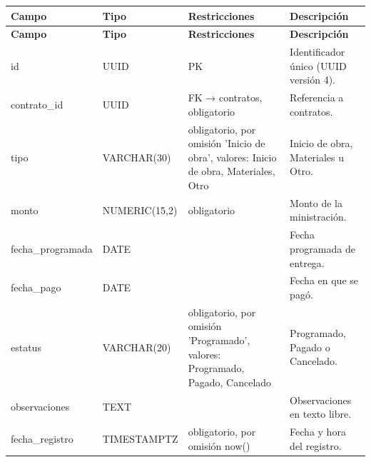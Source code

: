 \begin{xltabular}{\linewidth}{@{}>{\ttfamily\footnotesize}p{4.9cm}>{\ttfamily\footnotesize}p{2.4cm}>{\raggedright\arraybackslash\footnotesize}p{3.3cm}>{\footnotesize}X@{}}
\toprule\normalfont\sffamily\bfseries\footnotesize Campo & \normalfont\sffamily\bfseries\footnotesize Tipo & \sffamily\bfseries Restricciones & \sffamily\bfseries Descripción\\\midrule\endfirsthead
\toprule\normalfont\sffamily\bfseries\footnotesize Campo & \normalfont\sffamily\bfseries\footnotesize Tipo & \sffamily\bfseries Restricciones & \sffamily\bfseries Descripción\\\midrule\endhead
\bottomrule\endfoot
id & UUID & PK & Identificador único (UUID versión 4).\\
contrato\_id & UUID & FK → contratos, obligatorio & Referencia a contratos.\\
tipo & VARCHAR(30) & obligatorio, por omisión 'Inicio de obra', valores: Inicio de obra, Materiales, Otro & Inicio de obra, Materiales u Otro.\\
monto & NUMERIC(15,2) & obligatorio & Monto de la ministración.\\
fecha\_programada & DATE &  & Fecha programada de entrega.\\
fecha\_pago & DATE &  & Fecha en que se pagó.\\
estatus & VARCHAR(20) & obligatorio, por omisión 'Programado', valores: Programado, Pagado, Cancelado & Programado, Pagado o Cancelado.\\
observaciones & TEXT &  & Observaciones en texto libre.\\
fecha\_registro & TIMESTAMPTZ & obligatorio, por omisión now() & Fecha y hora del registro.\\
\end{xltabular}

